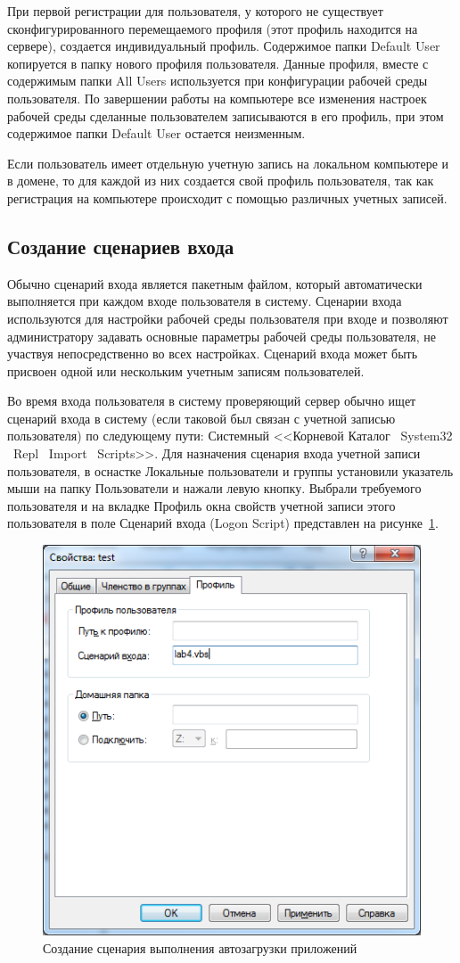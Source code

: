 При первой регистрации для пользователя, у которого не существует сконфигурированного
перемещаемого профиля (этот профиль находится на сервере),
создается индивидуальный профиль. Содержимое папки Default User копируется в папку
нового профиля пользователя. Данные профиля, вместе с содержимым папки All Users
используется при конфигурации рабочей среды пользователя. По завершении работы
на компьютере все изменения настроек рабочей среды сделанные пользователем
записываются в его профиль, при этом содержимое папки Default User остается неизменным.

Если пользователь имеет отдельную учетную запись на локальном компьютере и в домене,
то для каждой из них создается свой профиль пользователя, так как регистрация
на компьютере происходит с помощью различных учетных записей.


\subsection{Создание сценариев входа}

Обычно сценарий входа является пакетным файлом, который автоматически
выполняется при каждом входе пользователя в систему. Сценарии входа используются
для настройки рабочей среды пользователя при входе и позволяют администратору
задавать основные параметры рабочей среды пользователя, не участвуя
непосредственно во всех настройках. Сценарий входа может быть присвоен одной
или нескольким учетным записям пользователей.

Во время входа пользователя в систему проверяющий сервер обычно ищет сценарий
входа в систему (если таковой был связан с учетной записью пользователя) по
следующему пути: Системный <<Корневой Каталог \ System32 \ Repl \ Import \ Scripts>>.
Для назначения сценария входа учетной записи пользователя, в оснастке
Локальные пользователи и группы установили указатель мыши на папку Пользователи
и нажали левую кнопку. Выбрали требуемого пользователя и на вкладке
Профиль окна свойств учетной записи этого пользователя в поле
Сценарий входа (Logon Script) представлен на рисунке~\ref{pic:scenario_creation}.
\begin{figure} [h!]
  \centering
  \includegraphics[width=0.6\linewidth]{pic/scenario_creation}
  \caption{Создание сценария выполнения автозагрузки приложений}
  \label{pic:scenario_creation}
\end{figure}


